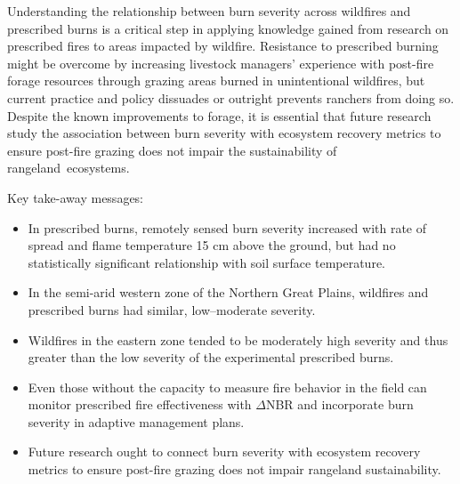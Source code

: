 \documentclass[fire,article,accept,oneauthor,pdftex]{Definitions/mdpi}
\begin{document}
Understanding the relationship between burn severity across wildfires and prescribed burns is a critical step in applying knowledge gained from research on prescribed fires to areas impacted by wildfire. 
Resistance to prescribed burning might be overcome by increasing livestock managers' experience with post-fire forage resources through grazing areas burned in unintentional wildfires, but current practice and policy dissuades or outright prevents ranchers from doing so.
Despite the known improvements to forage, it is essential that future research study the association between burn severity with ecosystem recovery metrics to ensure post-fire grazing does not impair the sustainability of rangeland~ecosystems. 

Key take-away messages: 

\begin{itemize}
	\item In prescribed burns, remotely sensed burn severity increased with rate of spread and flame temperature 15 cm above the ground, but had no statistically significant relationship with soil surface temperature.
	\item In the semi-arid western zone of the Northern Great Plains, wildfires and prescribed burns had similar, low--moderate severity. 
	\item Wildfires in the eastern zone tended to be moderately high severity and thus greater than the low severity of the experimental prescribed burns. 
	\item Even those without the capacity to measure fire behavior in the field can monitor prescribed fire effectiveness with $\Delta$NBR and incorporate burn severity in adaptive management plans. 
	\item Future research ought to connect burn severity with ecosystem recovery metrics to ensure post-fire grazing does not impair rangeland sustainability.
	
\end{itemize}
	

\vspace{6pt}



\end{document}
